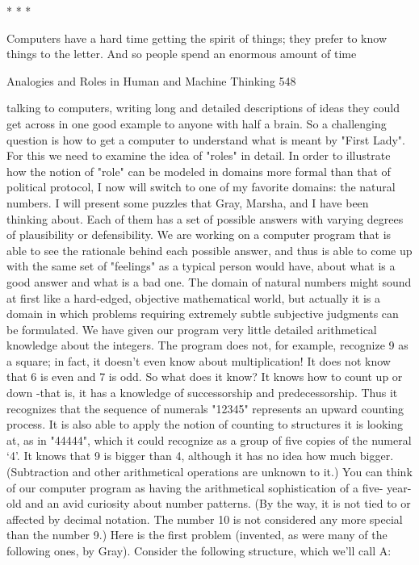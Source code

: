                                        *   *   *

        Computers have a hard time getting the spirit of things; they prefer to know
things to the letter. And so people spend an enormous amount of time




Analogies and Roles in Human and Machine Thinking                                   548

talking to computers, writing long and detailed descriptions of ideas they could get
across in one good example to anyone with half a brain. So a challenging question is
how to get a computer to understand what is meant by "First Lady". For this we need
to examine the idea of "roles" in detail.
        In order to illustrate how the notion of "role" can be modeled in domains more
formal than that of political protocol, I now will switch to one of my favorite
domains: the natural numbers. I will present some puzzles that Gray, Marsha, and I
have been thinking about. Each of them has a set of possible answers with varying
degrees of plausibility or defensibility. We are working on a computer program that is
able to see the rationale behind each possible answer, and thus is able to come up with
the same set of "feelings" as a typical person would have, about what is a good
answer and what is a bad one.
        The domain of natural numbers might sound at first like a hard-edged,
objective mathematical world, but actually it is a domain in which problems requiring
extremely subtle subjective judgments can be formulated. We have given our program
very little detailed arithmetical knowledge about the integers. The program does not,
for example, recognize 9 as a square; in fact, it doesn't even know about
multiplication! It does not know that 6 is even and 7 is odd. So what does it know? It
knows how to count up or down -that is, it has a knowledge of successorship and
predecessorship. Thus it recognizes that the sequence of numerals "12345" represents
an upward counting process. It is also able to apply the notion of counting to
structures it is looking at, as in "44444", which it could recognize as a group of five
copies of the numeral `4'. It knows that 9 is bigger than 4, although it has no idea how
much bigger. (Subtraction and other arithmetical operations are unknown to it.) You
can think of our computer program as having the arithmetical sophistication of a five-
year-old and an avid curiosity about number patterns. (By the way, it is not tied to or
affected by decimal notation. The number 10 is not considered any more special than
the number 9.)
        Here is the first problem (invented, as were many of the following ones, by
Gray). Consider the following structure, which we'll call A:

